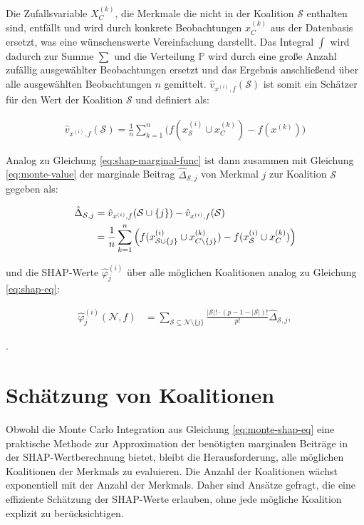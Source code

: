 Die Zufallsvariable $X_{C}^{(k)}$, die Merkmale die nicht in der Koalition $\mathcal{S}$ enthalten sind, 
entfällt und wird durch konkrete Beobachtungen $x_{C}^{(k)}$ aus der Datenbasis ersetzt, 
was eine wünschenswerte Vereinfachung darstellt. Das Integral $\int$ wird dadurch zur Summe $\sum$ und die Verteilung $\mathbb{P}$ wird durch eine große Anzahl zufällig 
ausgewählter Beobachtungen ersetzt und das Ergebnis anschließend über alle ausgewählten Beobachtungen $n$ gemittelt. 
$\hat{v}_{x^{(i)}, f}(\mathcal{S})$ ist somit ein Schätzer für den Wert der Koalition $\mathcal{S}$ und definiert als: 

\begin{align}
    \label{eq:monte-value}
    \hat{v}_{x^{(i)},f}(\mathcal{S}) = \frac{1}{n} \sum_{k=1}^{n} \Big(f(x^{(i)}_{\mathcal{S}} \cup x^{(k)}_{C}) - f(x^{(k)}) \Big)
\end{align}

Analog zu Gleichung \ref{eq:shap-marginal-func} ist dann zusammen mit Gleichung \ref{eq:monte-value} der marginale Beitrag 
$\hat{\Delta}_{\mathcal{S}, j}$ von Merkmal $j$ zur Koalition $\mathcal{S}$ gegeben als: 

\begin{align}
    \hat{\Delta}_{\mathcal{S}, j} &= \hat{v}_{x^{(i)},f}(\mathcal{S} \cup \{j\}) - \hat{v}_{x^{(i)},f}(\mathcal{S}) \\ \notag
        &= \frac{1}{n} \sum_{k=1}^{n} \Big(f(x^{(i)}_{\mathcal{S} \cup \{j\}} \cup x^{(k)}_{C \setminus \{j\}}) - f(x^{(i)}_{\mathcal{S}} \cup x^{(k)}_{C}) \Big)
\end{align}

und die SHAP-Werte $\hat{\varphi}_{j}^{(i)}$ über alle möglichen Koalitionen analog zu Gleichung \ref{eq:shap-eq}:

\begin{align}
    \label{eq:monte-shap-eq}
    \hat{\varphi}^{(i)}_{j} (\mathcal{N}, f) &= \sum_{\mathcal{S} \subseteq \mathcal{N} \setminus \{j\}} \frac{|\mathcal{S}|! \cdot (p - 1 - |\mathcal{S}|)!}{p!}\hat{\Delta}_{\mathcal{S}, j},
\end{align}

\cite[S.36]{Molnar_2023}.

\section{Schätzung von Koalitionen}

Obwohl die Monte Carlo Integration aus Gleichung \ref{eq:monte-shap-eq} eine praktische Methode zur Approximation der benötigten marginalen Beiträge in der 
SHAP-Wertberechnung bietet, bleibt die Herausforderung, alle möglichen Koalitionen der Merkmals zu evaluieren. 
Die Anzahl der Koalitionen wächst exponentiell mit der Anzahl der Merkmals. Daher sind Ansätze gefragt, die eine effiziente Schätzung der SHAP-Werte erlauben, 
ohne jede mögliche Koalition explizit zu berücksichtigen.

